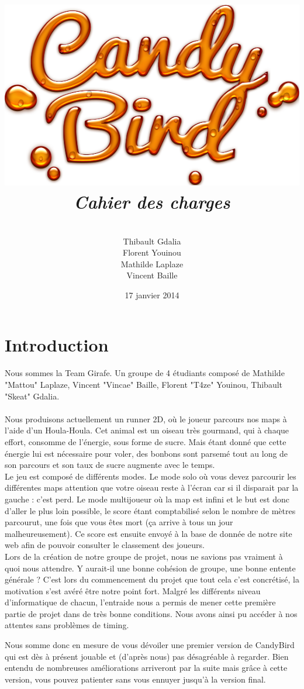 \documentclass [11pt]{report}
\title{
	\includegraphics[scale=0.43]{images/Logojeu.png}
	 \\\vspace{20mm}
	\textbf{\Huge \itshape Cahier des charges }
	}
\author{ \\\vspace{2mm}
	Thibault Gdalia\\\vspace{2mm}
	Florent Youinou\\\vspace{2mm}
	Mathilde Laplaze\\\vspace{2mm}
	Vincent Baille \\\vspace{30mm}
	}
\date{17 janvier 2014}
\begin{document}
\thispagestyle{fancy}
\renewcommand{\baselinestretch}{0.001}
\maketitle
\tableofcontents

\newpage



\chapter*{Introduction}

\indent Nous sommes la Team Girafe. Un groupe de 4 étudiants composé de Mathilde "Mattou" Laplaze, Vincent "Vincae" Baille, Florent "T4ze" Youinou, Thibault "Skeat" Gdalia. \\\\
\indent Nous produisons actuellement un runner 2D, où le joueur parcours nos maps à l'aide d'un Houla-Houla. Cet animal est un oiseau très gourmand, qui à chaque effort, consomme de l'énergie, sous forme de sucre. Mais étant donné que cette énergie lui est nécessaire pour voler, des bonbons sont parsemé tout au long de son parcours et son taux de sucre augmente avec le temps.\\
\indent Le jeu est composé de différents modes. Le mode solo où vous devez parcourir les différentes maps attention que votre oiseau reste à l'écran car si il disparait par la gauche : c'est perd. Le mode multijoueur où la map est infini et le but est donc d'aller le plus loin possible, le score étant comptabilisé selon le nombre de mètres parcourut, une fois que vous êtes mort (ça arrive à tous un jour malheureusement). Ce score est ensuite envoyé à la base de donnée de notre site web afin de pouvoir consulter le classement des joueurs.\\

Lors de la création de notre groupe de projet, nous ne savions pas vraiment à quoi nous attendre. Y aurait-il une bonne cohésion de groupe, une bonne entente générale ? C'est lors du commencement du projet que tout cela c'est concrétisé, la motivation s'est avéré être notre point fort. Malgré les différents niveau d'informatique de chacun, l'entraide nous a permis de mener cette première partie de projet dans de très bonne conditions. Nous avons ainsi pu accéder à nos attentes sans problèmes de timing.

Nous somme donc en mesure de vous dévoiler une premier version de CandyBird qui est dès à présent jouable et (d'après nous) pas désagréable à regarder. Bien entendu de nombreuses améliorations arriveront par la suite mais grâce à cette version, vous pouvez patienter sans vous ennuyer jusqu'à la version final.\\
\end{document}
